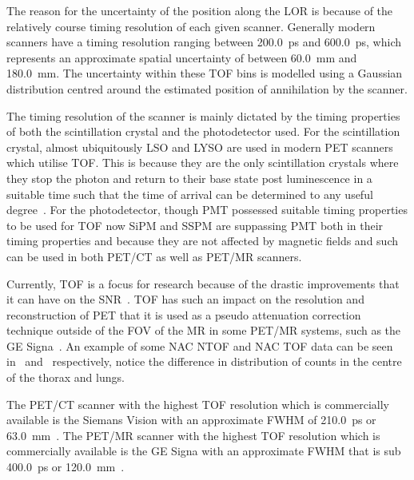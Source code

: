                 The reason for the uncertainty of the position along the \gls{LOR} is because of the relatively course timing resolution of each given scanner. Generally modern scanners have a timing resolution ranging between \SI{200.0}{\pico\second} and \SI{600.0}{\pico\second}, which represents an approximate spatial uncertainty of between \SI{60.0}{\milli\metre} and \SI{180.0}{\milli\metre}. The uncertainty within these \gls{TOF} bins is modelled using a Gaussian distribution centred around the estimated position of annihilation by the scanner.
                
                The timing resolution of the scanner is mainly dictated by the timing properties of both the scintillation crystal and the photodetector used. For the scintillation crystal, almost ubiquitously \gls{LSO} and \gls{LYSO} are used in modern \gls{PET} scanners which utilise \gls{TOF}. This is because they are the only scintillation crystals where they stop the photon and return to their base state post luminescence in a suitable time such that the time of arrival can be determined to any useful degree~. For the photodetector, though \gls{PMT} possessed suitable timing properties to be used for \gls{TOF} now \gls{SiPM} and \gls{SSPM} are suppassing \gls{PMT} both in their timing properties and because they are not affected by magnetic fields and such can be used in both \gls{PET}/\gls{CT} as well as \gls{PET}/\gls{MR} scanners.
                
                Currently, \gls{TOF} is a focus for research because of the drastic improvements that it can have on the \gls{SNR}~. \gls{TOF} has such an impact on the resolution and reconstruction of \gls{PET} that it is used as a pseudo attenuation correction technique outside of the \gls{FOV} of the \gls{MR} in some \gls{PET}/\gls{MR} systems, such as the \gls{GE} Signa~. An example of some \gls{NAC} \gls{NTOF} and \gls{NAC} \gls{TOF} data can be seen in~ and~ respectively, notice the difference in distribution of counts in the centre of the thorax and lungs.
                
                The \gls{PET}/\gls{CT} scanner with the highest \gls{TOF} resolution which is commercially available is the Siemans Vision with an approximate \gls{FWHM} of \SI{210.0}{\pico\second} or \SI{63.0}{\milli\metre}~. The \gls{PET}/\gls{MR} scanner with the highest \gls{TOF} resolution which is commercially available is the \gls{GE} Signa with an approximate \gls{FWHM} that is sub \SI{400.0}{\pico\second} or \SI{120.0}{\milli\metre}~.
            
